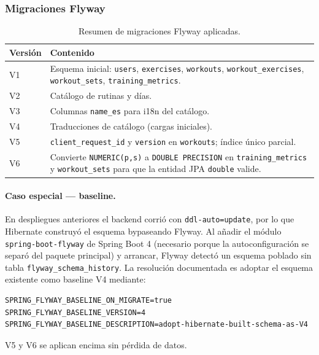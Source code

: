 \documentclass[11pt,a4paper]{article}
\begin{document}
\subsubsection{Migraciones Flyway}

\begin{table}[H]
\centering
\begin{tabularx}{\textwidth}{lX}
\toprule
\textbf{Versión} & \textbf{Contenido} \\
\midrule
V1 & Esquema inicial: \texttt{users}, \texttt{exercises}, \texttt{workouts}, \texttt{workout\_exercises}, \texttt{workout\_sets}, \texttt{training\_metrics}. \\
V2 & Catálogo de rutinas y días. \\
V3 & Columnas \texttt{name\_es} para i18n del catálogo. \\
V4 & Traducciones de catálogo (cargas iniciales). \\
V5 & \texttt{client\_request\_id} y \texttt{version} en \texttt{workouts}; índice único parcial. \\
V6 & Convierte \texttt{NUMERIC(p,s)} a \texttt{DOUBLE PRECISION} en \texttt{training\_metrics} y \texttt{workout\_sets} para que la entidad JPA \texttt{double} valide. \\
\bottomrule
\end{tabularx}
\caption{Resumen de migraciones Flyway aplicadas.}
\end{table}

\paragraph{Caso especial — baseline.} En despliegues anteriores el backend corrió con \texttt{ddl-auto=update}, por lo que Hibernate construyó el esquema bypaseando Flyway. Al añadir el módulo \texttt{spring-boot-flyway} de Spring Boot 4 (necesario porque la autoconfiguración se separó del paquete principal) y arrancar, Flyway detectó un esquema poblado sin tabla \texttt{flyway\_schema\_history}. La resolución documentada es adoptar el esquema existente como baseline V4 mediante:

\begin{lstlisting}[caption={Recetas de baseline para adoptar un esquema construido por Hibernate.}]
SPRING_FLYWAY_BASELINE_ON_MIGRATE=true
SPRING_FLYWAY_BASELINE_VERSION=4
SPRING_FLYWAY_BASELINE_DESCRIPTION=adopt-hibernate-built-schema-as-V4
\end{lstlisting}

V5 y V6 se aplican encima sin pérdida de datos.
\end{document}
